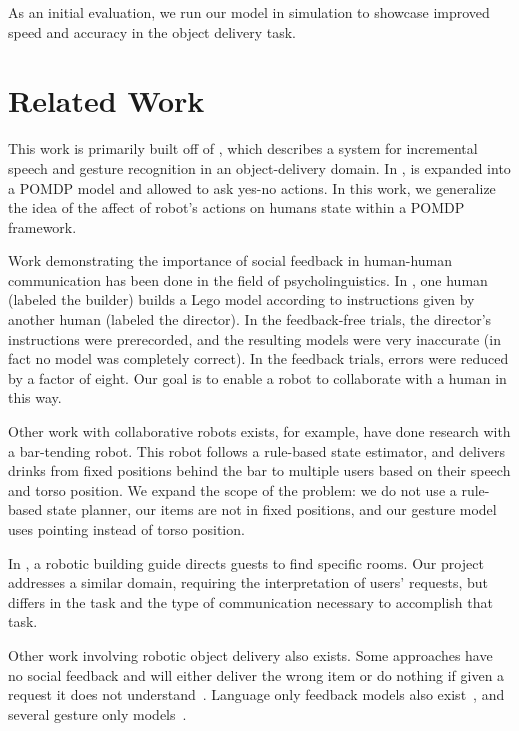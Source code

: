 \documentclass{article}
\begin{document}
\begin{multicols}{2}
As an initial evaluation, we run our model in simulation to showcase improved speed and accuracy in the object delivery task. 


\section{Related Work}

This work is primarily built off of \cite{eldon15thesis}, which describes a system for incremental speech and gesture recognition in an object-delivery domain. In \cite{socialfeedback}, \cite{eldon15thesis} is expanded into a POMDP model and allowed to ask yes-no actions. In this work, we generalize the idea of the affect of robot's actions on humans state within a POMDP framework. 

Work demonstrating the importance of social feedback in human-human
communication has been done in the field of psycholinguistics. In  \cite{clark04}, one human (labeled the builder)
builds a Lego model according to instructions given by another human
(labeled the director). In the feedback-free trials, the director's
instructions were prerecorded, and the resulting models were very
inaccurate (in fact no model was completely correct). In the feedback
trials, errors were reduced by a factor of eight. Our goal is to
enable a robot to collaborate with a human in this way.


Other work with collaborative robots exists, for example, \cite{foster12} have done research with a bar-tending robot. This robot follows a rule-based state estimator, and delivers drinks from fixed positions behind the bar to multiple users based on their speech and torso position. 
We expand the scope of the problem: we do not use a rule-based state planner, our items are not in fixed positions, and our gesture model uses pointing instead of torso position. 

In \cite{bohus14},  a robotic building guide directs guests to find specific rooms. Our project addresses a similar domain, requiring the interpretation of users' requests, but differs in the task and the type of communication necessary to accomplish that task. 

Other work involving robotic object delivery also exists. Some approaches have no social feedback and will either deliver the wrong item or do nothing if given a
request it does not understand~\citep{tellex11,matuszek12,tellex12,misra14}. Language only feedback models also 
exist~\citep{chai14,macmahon06,tellex11,matuszek12,guadarrama14,hewlett11,misra14}, and several gesture only models~\citep{waldherr00,marge11}.



\end{multicols}
\end{document}
